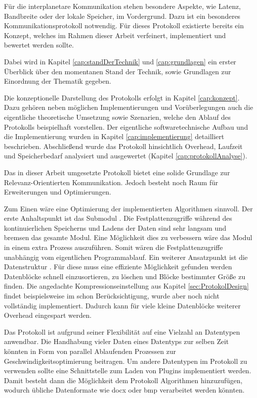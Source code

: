 Für die interplanetare Kommunikation stehen besondere Aspekte, wie Latenz,
Bandbreite oder der lokale Speicher, im Vordergrund. Dazu ist ein besonderes
Kommunikationsprotokoll notwendig. Für dieses Protokoll  existierte
bereits ein Konzept, welches im Rahmen dieser Arbeit verfeinert, implementiert
und bewertet werden sollte.

Dabei wird in Kapitel \ref{cap:standDerTechnik} und \ref{cap:grundlagen} ein
erster Überblick über den momentanen Stand der Technik, sowie Grundlagen zur
Einordnung der Thematik gegeben.

Die konzeptionelle Darstellung des Protokolls erfolgt in Kapitel
\ref{cap:konzept}. Dazu gehören neben möglichen Implementierungen und
Vorüberlegungen auch die eigentliche theoretische Umsetzung sowie Szenarien,
welche den Ablauf des Protokolls beispielhaft vorstellen. Der eigentliche
softwaretechnische Aufbau und die Implementierung wurden in Kapitel
\ref{cap:implementierung} detailliert beschrieben. Abschließend wurde das
Protokoll hinsichtlich Overhead, Laufzeit und Speicherbedarf analysiert und
ausgewertet (Kapitel \ref{cap:protokollAnalyse}).

Das in dieser Arbeit umgesetzte Protokoll bietet eine solide
Grundlage zur Relevanz-Orientierten Kommunikation. Jedoch besteht noch Raum
für Erweiterungen und Optimierungen.

Zum Einen wäre eine Optimierung der implementierten Algorithmen sinnvoll.
Der erste Anhaltspunkt ist das Submodul .
Die Festplattenzugriffe während des kontinuierlichen Speicherns und Ladens der Daten
sind sehr langsam und bremsen das gesamte Modul. Eine Möglichkeit dies zu
verbessern wäre das Modul in einem extra Prozess auszuf{\"u}hren. Somit wären
die Festplattenzugriffe unabhängig vom eigentlichen Programmablauf. Ein
weiterer Ansatzpunkt ist die Datenstruktur . Für diese muss
eine effiziente Möglichkeit gefunden werden Datenblöcke schnell
einzusortieren, zu löschen und Bl{\"o}cke bestimmter Größe zu finden.
Die angedachte Kompressionseinstellung aus Kapitel \ref{sec:ProtokolDesign}
findet beispielsweise im  schon Berücksichtigung, wurde aber
noch nicht vollständig implementiert. Dadurch kann für viele kleine Datenblöcke
weiterer Overhead eingespart werden.

Das Protokoll ist aufgrund seiner Flexibilität auf eine Vielzahl an Datentypen
anwendbar. Die Handhabung vieler Daten eines Datentyps zur selben Zeit könnten
in Form von parallel Ablaufenden Prozessen zur Geschwindigkeitsoptimierung
beitragen. Um andere Datentypen im Protokoll zu verwenden sollte eine
Schnittstelle zum Laden von Plugins implementiert werden. Damit besteht dann die
Möglichkeit dem Protokoll Algorithmen hinzuzufügen, wodurch
übliche Datenformate wie docx oder bmp verarbeitet werden k{\"o}nnten.

